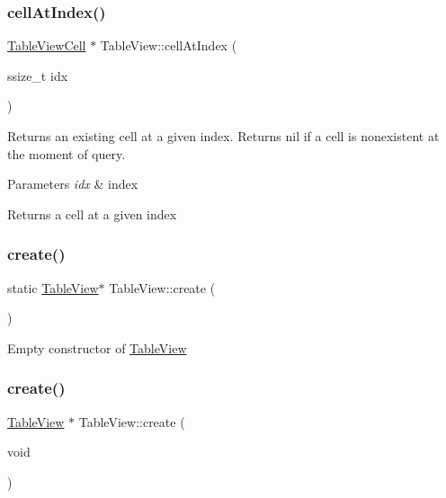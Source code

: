 \subsubsection{\texorpdfstring{cell\+At\+Index()}{cellAtIndex()}\hspace{0.1cm}{\footnotesize\ttfamily [2/2]}}
{\footnotesize\ttfamily \hyperlink{classTableViewCell}{Table\+View\+Cell} $\ast$ Table\+View\+::cell\+At\+Index (\begin{DoxyParamCaption}\item[{ssize\+\_\+t}]{idx }\end{DoxyParamCaption})}

Returns an existing cell at a given index. Returns nil if a cell is nonexistent at the moment of query.


\begin{DoxyParams}{Parameters}
{\em idx} & index \\
\hline
\end{DoxyParams}
\begin{DoxyReturn}{Returns}
a cell at a given index 
\end{DoxyReturn}
\mbox{\label{classTableView_af5e1b12f61e42fc05c1e798bd9603af6}} 
\subsubsection{\texorpdfstring{create()}{create()}\hspace{0.1cm}{\footnotesize\ttfamily [1/6]}}
{\footnotesize\ttfamily static \hyperlink{classTableView}{Table\+View}$\ast$ Table\+View\+::create (\begin{DoxyParamCaption}{ }\end{DoxyParamCaption})\hspace{0.3cm}{\ttfamily [static]}}

Empty constructor of \hyperlink{classTableView}{Table\+View} \mbox{\label{classTableView_a298f6ec9b9dc31b643b2027e3c91d6a1}} 
\subsubsection{\texorpdfstring{create()}{create()}\hspace{0.1cm}{\footnotesize\ttfamily [2/6]}}
{\footnotesize\ttfamily \hyperlink{classTableView}{Table\+View} $\ast$ Table\+View\+::create (\begin{DoxyParamCaption}\item[{void}]{ }\end{DoxyParamCaption})\hspace{0.3cm}{\ttfamily [static]}}

